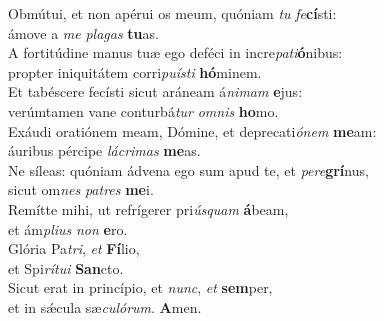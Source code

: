 \oddverse Obmútui, et non apérui os meum, quóniam \textit{tu} \textit{fe}\textbf{cí}sti:~\*\\
\oddverse ámove a \textit{me} \textit{pla}\textit{gas} \textbf{tu}as.\\
\evenverse A fortitúdine manus tuæ ego deféci in incre\textit{pa}\textit{ti}\textbf{ó}nibus:~\*\\
\evenverse propter iniquitátem corri\textit{pu}\textit{í}\textit{sti} \textbf{hó}minem.\\
\oddverse Et tabéscere fecísti sicut aráneam á\textit{ni}\textit{mam} \textbf{e}jus:~\*\\
\oddverse verúmtamen vane conturbá\textit{tur} \textit{om}\textit{nis} \textbf{ho}mo.\\
\evenverse Exáudi oratiónem meam, Dómine, et deprecati\textit{ó}\textit{nem} \textbf{me}am:~\*\\
\evenverse áuribus pércipe \textit{lá}\textit{cri}\textit{mas} \textbf{me}as.\\
\oddverse Ne síleas: quóniam ádvena ego sum apud te, et \textit{pe}\textit{re}\textbf{grí}nus,~\*\\
\oddverse sicut om\textit{nes} \textit{pa}\textit{tres} \textbf{me}i.\\
\evenverse Remítte mihi, ut refrígerer pri\textit{ús}\textit{quam} \textbf{á}beam,~\*\\
\evenverse et ám\textit{pli}\textit{us} \textit{non} \textbf{e}ro.\\
\oddverse Glória Pa\textit{tri}, \textit{et} \textbf{Fí}lio,~\*\\
\oddverse et Spi\textit{rí}\textit{tu}\textit{i} \textbf{San}cto.\\
\evenverse Sicut erat in princípio, et \textit{nunc}, \textit{et} \textbf{sem}per,~\*\\
\evenverse et in sǽcula sæ\textit{cu}\textit{ló}\textit{rum}. \textbf{A}men.\\
